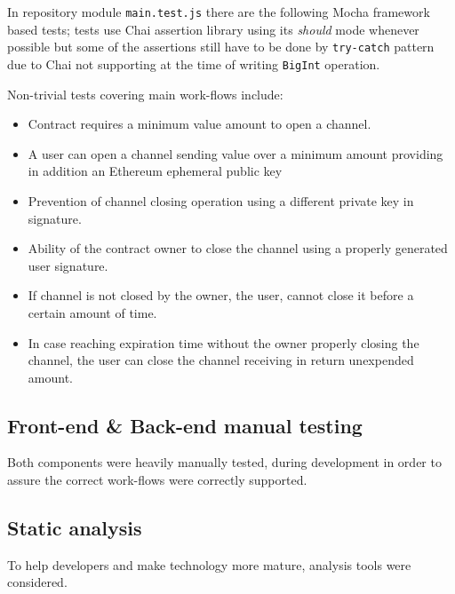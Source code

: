 \documentclass[12pt]{amsart}
\begin{document}
\begin{multicols}{2}
\vspace{0.35cm}

In repository\cite{state-channel-contract-a} module
\texttt{main.test.js} there are the following Mocha
framework\cite{mocha} based tests; tests use Chai assertion
library\cite{chai} using its \textit{should} mode whenever
possible but some of the assertions still have to be done
by \texttt{try-catch} pattern due to Chai not supporting
at the time of writing \texttt{BigInt} operation.

\vspace{0.35cm}

Non-trivial tests covering main work-flows include:
\begin{itemize}
\item Contract requires a minimum value amount to open a channel.
\item A user can open a channel sending value over a minimum amount providing
  in addition an Ethereum ephemeral public key
\item Prevention of channel closing operation using a different private key
  in signature.
\item Ability of the contract owner to close the channel using a properly
  generated user signature.
\item If channel is not closed by the owner, the user, cannot close it
  before a certain amount of time.
\item In case reaching expiration time without the owner properly closing the channel,
  the user can close the channel receiving in return unexpended amount.
\end{itemize}

\subsection{Front-end \& Back-end manual testing}

\vspace{0.35cm}

Both components were heavily manually tested, during development
in order to assure the correct work-flows were correctly supported.


\subsection{Static analysis}

\vspace{0.35cm}

To help developers and make technology more mature,
analysis tools\cite{ConsenSys19} were considered.


\end{multicols}
\end{document}

